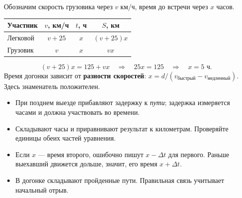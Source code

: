\documentclass[a4paper,12pt]{article}
\newcommand{\subidea}[1]{\vspace{5pt}{\color{darkaccent}\large\bfseries #1}\par\vspace{2pt}}
\begin{document}
Обозначим скорость грузовика через $v$ км/ч, время до встречи через $x$ часов.
\begin{center}
\begin{tabular}{@{}lccc@{}}\toprule
Участник & $v$, км/ч & $t$, ч & $S$, км\\\midrule
Легковой & $v+25$ & $x$ & $(v+25)x$\\
Грузовик & $v$ & $x$ & $vx$\\\bottomrule
\end{tabular}
\end{center}
\[
(v+25)x=125+vx\quad\Longrightarrow\quad25x=125
\quad\Longrightarrow\quad\boxed{x=5\text{ ч}}.
\]
Время догонки зависит от \textbf{разности скоростей}: $x=d/(v_{\text{быстрый}}-v_{\text{медленный}})$. Здесь знаменатель положителен.

\subidea{Типичные ошибки}
\begin{itemize}
\item При позднем выезде прибавляют задержку к \emph{пути}; задержка измеряется часами и должна участвовать во времени.
\item Складывают часы и приравнивают результат к километрам. Проверяйте единицы обеих частей уравнения.
\item Если $x$ --- время второго, ошибочно пишут $x-\Delta t$ для первого. Раньше выехавший движется дольше, значит, его время $x+\Delta t$.
\item В догонке складывают пройденные пути. Правильная связь учитывает начальный отрыв.
\end{itemize}
\end{document}
